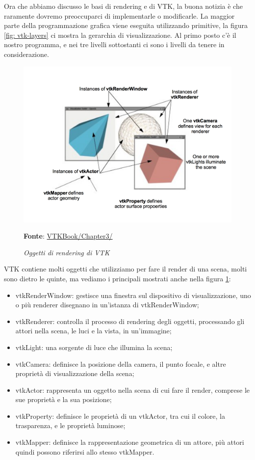 Ora che abbiamo discusso le basi di rendering e di VTK, la buona notizia è che raramente dovremo preoccuparci di implementarle o modificarle. La maggior parte della programmazione grafica viene eseguita utilizzando primitive, la figura \ref{fig: vtk-layers} ci mostra la gerarchia di visualizzazione. Al primo posto c'è il nostro programma, e nei tre livelli sottostanti ci sono i livelli da tenere in considerazione.

\begin{figure}[h]
    \centering
    \includegraphics[scale=0.5]{immagini/volumerendering/vtkobjects.png}
    \caption{\textit{Oggetti di rendering di VTK}}
    \textbf{Fonte}: \href{https://lorensen.github.io/VTKExamples/site/VTKBook/03Chapter3/}{VTKBook/Chapter3/}
    \label{fig: Oggetti Rendering VTK}
\end{figure}

VTK contiene molti oggetti che utilizziamo per fare il render di una scena, molti sono dietro le quinte, ma vediamo i principali mostrati anche nella figura \ref{fig: Oggetti Rendering VTK}:
\begin{itemize}
\item vtkRenderWindow: gestisce una finestra sul dispositivo di visualizzazione, uno o più renderer disegnano in un'istanza di vtkRenderWindow;
\item vtkRenderer: controlla il processo di rendering degli oggetti, processando gli attori nella scena, le luci e la vista, in un'immagine;
\item vtkLight: una sorgente di luce che illumina la scena;
\item vtkCamera: definisce la posizione della camera, il punto focale, e altre proprietà di visualizzazione della scena;
\item vtkActor: rappresenta un oggetto nella scena di cui fare il render, comprese le sue proprietà e la sua posizione;
\item vtkProperty: definisce le proprietà di un vtkActor, tra cui il colore, la trasparenza, e le proprietà luminose;  
\item vtkMapper: definisce la rappresentazione geometrica di un attore, più attori quindi possono riferirsi allo stesso vtkMapper.
\end{itemize}

